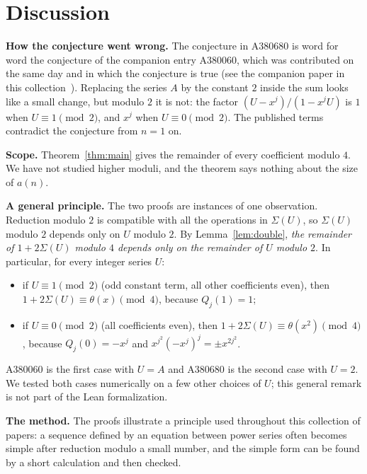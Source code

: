 \documentclass[11pt,a4paper]{article}
\theoremstyle{definition}
\theoremstyle{remark}
\newcommand{\para}[1]{\par\medskip\noindent\textbf{#1}\enspace}
\begin{document}
\section{Discussion}\label{sec:discussion}

\para{How the conjecture went wrong.} The conjecture in A380680 is word for word the conjecture of the companion entry
A380060, which was contributed on the same day and in which the conjecture is true (see the companion paper in this
collection~\cite{repo}). Replacing the series $A$ by the constant $2$ inside the sum looks like a small change, but
modulo $2$ it is not: the factor $(U-x^j)/(1-x^jU)$ is $1$ when $U\equiv1\pmod2$, and $x^j$ when $U\equiv0\pmod2$.
The published terms contradict the conjecture from $n=1$ on.

\para{Scope.} Theorem~\ref{thm:main} gives the remainder of every coefficient modulo $4$. We have not studied higher
moduli, and the theorem says nothing about the size of $a(n)$.

\para{A general principle.} The two proofs are instances of one observation. Reduction modulo $2$ is compatible with
all the operations in $\Sigma(U)$, so $\Sigma(U)$ modulo $2$ depends only on $U$ modulo $2$. By
Lemma~\ref{lem:double}, \emph{the remainder of $1+2\Sigma(U)$ modulo $4$ depends only on the remainder of $U$ modulo
$2$}. In particular, for every integer series $U$:
\begin{itemize}
\item if $U\equiv1\pmod2$ (odd constant term, all other coefficients even), then $1+2\Sigma(U)\equiv\theta(x)\pmod4$,
because $Q_j(1)=1$;
\item if $U\equiv0\pmod2$ (all coefficients even), then $1+2\Sigma(U)\equiv\theta(x^2)\pmod4$, because
$Q_j(0)=-x^j$ and $x^{j^2}(-x^j)^j=\pm x^{2j^2}$.
\end{itemize}
A380060 is the first case with $U=A$ and A380680 is the second case with $U=2$. We tested both cases numerically on
a few other choices of $U$; this general remark is not part of the Lean formalization.

\para{The method.} The proofs illustrate a principle used throughout this collection of papers: a sequence defined by
an equation between power series often becomes simple after reduction modulo a small number, and the simple form can
be found by a short calculation and then checked.
\end{document}

